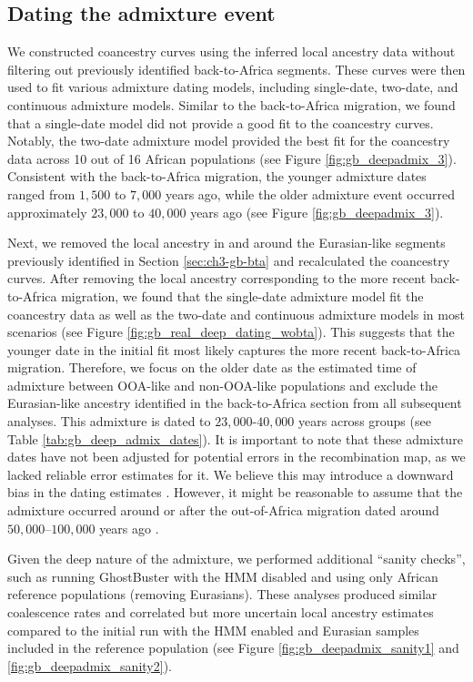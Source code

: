 \clearpage

\subsection{Dating the admixture event}

We constructed coancestry curves using the inferred local ancestry data without filtering out previously identified back-to-Africa segments. These curves were then used to fit various admixture dating models, including single-date, two-date, and continuous admixture models. Similar to the back-to-Africa migration, we found that a single-date model did not provide a good fit to the coancestry curves. Notably, the two-date admixture model provided the best fit for the coancestry data across 10 out of 16 African populations (see Figure \ref{fig:gb_deepadmix_3}). Consistent with the back-to-Africa migration, the younger admixture dates ranged from $1{,}500$ to $7{,}000$ years ago, while the older admixture event occurred approximately $23{,}000$ to $40{,}000$ years ago (see Figure \ref{fig:gb_deepadmix_3}).

Next, we removed the local ancestry in and around the Eurasian-like segments previously identified in Section \ref{sec:ch3-gb-bta} and recalculated the coancestry curves. After removing the local ancestry corresponding to the more recent back-to-Africa migration, we found that the single-date admixture model fit the coancestry data as well as the two-date and continuous admixture models in most scenarios (see Figure \ref{fig:gb_real_deep_dating_wobta}). This suggests that the younger date in the initial fit most likely captures the more recent back-to-Africa migration. Therefore, we focus on the older date as the estimated time of admixture between OOA-like and non-OOA-like populations and exclude the Eurasian-like ancestry identified in the back-to-Africa section from all subsequent analyses. This admixture is dated to  $23{,}000$-$40{,}000$ years across groups (see Table \ref{tab:gb_deep_admix_dates}). It is important to note that these admixture dates have not been adjusted for potential errors in the recombination map, as we lacked reliable error estimates for it. We believe this may introduce a downward bias in the dating estimates \cite{sankararaman2012date}. However, it might be reasonable to assume that the admixture occurred around or after the out-of-Africa migration dated around $50{,}000$–$100{,}000$ years ago \cite{lopez2015human}. 

Given the deep nature of the admixture, we performed additional ``sanity checks'', such as running GhostBuster with the HMM disabled and using only African reference populations (removing Eurasians). These analyses produced similar coalescence rates and correlated but more uncertain local ancestry estimates compared to the initial run with the HMM enabled and Eurasian samples included in the reference population (see Figure \ref{fig:gb_deepadmix_sanity1} and \ref{fig:gb_deepadmix_sanity2}).

